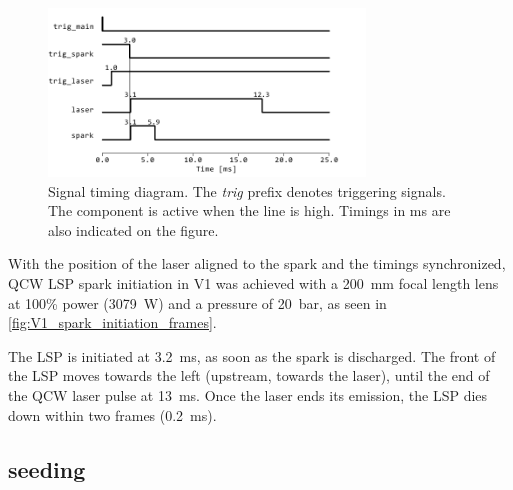             \begin{figure}[!ht]
                \centering
                \includegraphics[width=0.75\textwidth]{assets/4 experiments/timings.pdf}
                \caption{Signal timing diagram. The \textit{trig} prefix denotes triggering signals. The component is active when the line is high. Timings in \unit{ms} are also indicated on the figure.}
                \label{fig: Signal timing diagram}
            \end{figure}

            With the position of the laser aligned to the spark and the timings synchronized, QCW LSP spark initiation in V1 was achieved with a \qty{200}{mm} focal length lens at 100\% power (\qty{3079}{W}) and a pressure of \qty{20}{bar}, as seen in \autoref{fig:V1_spark_initiation_frames}.
            
            
            
            The LSP is initiated at \qty{3.2}{ms}, as soon as the spark is discharged. The front of the LSP moves towards the left (upstream, towards the laser), until the end of the QCW laser pulse at \qty{13}{ms}. Once the laser ends its emission, the LSP dies down within two frames (\qty{0.2}{ms}).

        \subsection{ seeding}

            
